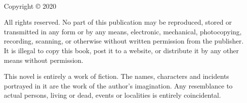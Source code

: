 {\small\RaggedRight
\setlength{\parindent}{0em}\setlength{\parskip}{1em}

~

\vfill

Copyright \copyright{} 2020 \bookauthor

All rights reserved. No part of this publication may be reproduced, stored or transmitted in any form or by any means, electronic, mechanical, photocopying, recording, scanning, or otherwise without written permission from the publisher. It is illegal to copy this book, post it to a website, or distribute it by any other means without permission.

This novel is entirely a work of fiction. The names, characters and incidents portrayed in it are the work of the author’s imagination. Any resemblance to actual persons, living or dead, events or localities is entirely coincidental.
}
